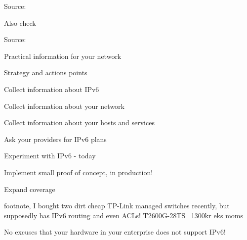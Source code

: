 \documentclass[20pt,landscape,a4paper,footrule]{foils}
\begin{document}

Source: 

Also check 

\centerline{}





Source:


Practical information for your network

\begin{list1}
\item Strategy and actions points
\begin{list2}
\item Collect information about IPv6
\item Collect information about your network
\item Collect information about your hosts and services
\item Ask your providers for IPv6 plans
\item Experiment with IPv6 - today
\item Implement small proof of concept, in production!
\item Expand coverage
\end{list2}
\end{list1}

footnote, I bought two dirt cheap TP-Link managed switches recently, but supposedly has IPv6 routing and even ACLs! T2600G-28TS ~1300kr eks moms\\ {\footnotesize{}}

No excuses that your hardware in your enterprise does not support IPv6!


\end{document}
